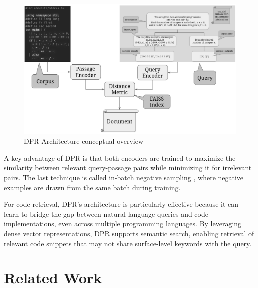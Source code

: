 \documentclass[12pt]{article}
\begin{document}
\begin{figure}[ht]
\centering
\includegraphics[width=1.0\textwidth]{images/dpr-architecture-gray.png}
\caption{DPR Architecture conceptual overview}
\label{fig:dpr-architecture}
\end{figure}

A key advantage of DPR is that both encoders are trained to maximize the similarity between relevant query-passage pairs while minimizing it for irrelevant pairs. The last technique is called in-batch negative sampling \cite{Choi2021}, where negative examples are drawn from the same batch during training.

For code retrieval, DPR's architecture is particularly effective because it can learn to bridge the gap between natural language queries and code implementations, even across multiple programming languages. By leveraging dense vector representations, DPR supports semantic search, enabling retrieval of relevant code snippets that may not share surface-level keywords with the query.

\section{Related Work}


\end{document}
